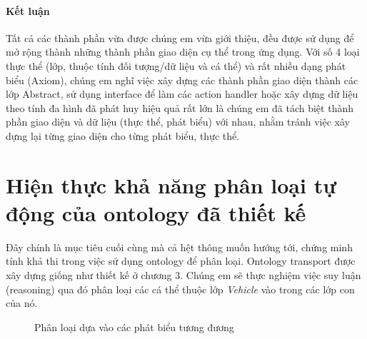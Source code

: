\paragraph{Kết luận} Tất cả các thành phần vừa được chúng em vừa giới thiệu, đều được sử dụng để mở rộng thành những thành phần giao diện cụ thể trong ứng dụng. Với số 4 loại thực thể (lớp, thuộc tính đối tượng/dữ liệu và cá thể) và rất nhiều dạng phát biểu (Axiom), chúng em nghĩ việc xây dựng các thành phần giao diện thành các lớp Abstract, sử dụng interface để làm các action handler hoặc xây dựng dữ liệu theo tính đa hình đã phát huy hiệu quả rất lớn là chúng em đã tách biệt thành phần giao diện và dữ liệu (thực thể, phát biểu) với nhau, nhằm tránh việc xây dựng lại từng giao diện cho từng phát biểu, thực thể.
\section{Hiện thực khả năng phân loại tự động của ontology đã thiết kế}
Đây chính là mục tiêu cuối cùng mà cả hệt thông muốn hướng tới, chứng minh tính khả thi trong việc sử dụng ontology để phân loại. Ontology transport \cite{owleditorSrc} được xây dựng giống như thiết kế ở chương 3. Chúng em sẽ thực nghiệm việc suy luận (reasoning) qua đó phân loại các cá thể thuộc lớp \textit{Vehicle} vào trong các lớp con của nó.
\begin{figure}[h!]
	\centering
	\caption{Phân loại dựa vào các phát biểu tương đương\label{overflow}}
\end{figure}
